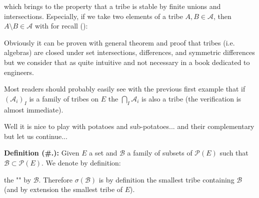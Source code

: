 	which brings to the property that a tribe is stable by finite unions and intersections. Especially, if we take two elements of a tribe $A,B\in \mathcal{A}$, then $A\setminus B\in \mathcal{A}$ with for recall ():
	
	Obviously it can be proven with general theorem and proof that tribes (i.e. algebras) are closed under set intersections, differences, and symmetric differences but we consider that as quite intuitive and not necessary in a book dedicated to engineers.
	\begin{tcolorbox}[title=Remark,arc=10pt,breakable,drop lifted shadow,
  skin=enhanced,
  skin first is subskin of={enhancedfirst}{arc=10pt,no shadow},
  skin middle is subskin of={enhancedmiddle}{arc=10pt,no shadow},
  skin last is subskin of={enhancedlast}{drop lifted shadow}]
	Most readers should probably easily see with the previous first example that if $(\mathcal{A}_i)_I$ is a family of tribes on $E$ the $\bigcap_I \mathcal{A}_i$ is also a tribe (the verification is almost immediate).
	\end{tcolorbox}	
	Well it is nice to play with potatoes and sub-potatoes... and their complementary but let us continue...
	
	\textbf{Definition (\#\thesection.\mydef):} Given $E$ a set and $\mathcal{B}$ a family of subsets of $\mathcal{P}(E)$ such that $\mathcal{B}\subset \mathcal{P}(E)$. We denote by definition:
	
	the "" by $\mathcal{B}$. Therefore $\sigma(\mathcal{B})$ is by definition the smallest tribe containing $\mathcal{B}$ (and by extension the smallest tribe of $E$).

